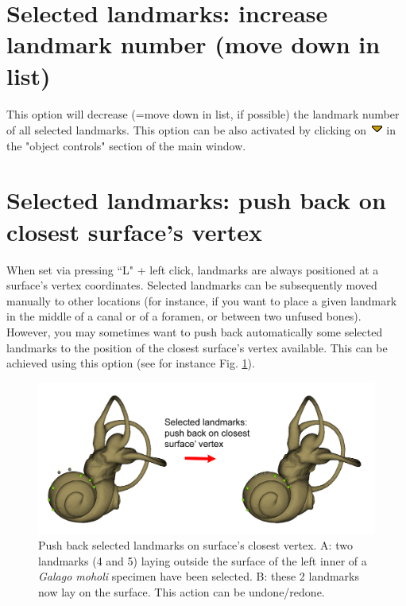 \section{Selected landmarks: increase landmark number (move down in list)}
 This option will decrease (=move down in list, if possible) the landmark number of all selected landmarks.
This option can be also activated by clicking on \includegraphics[scale=0.7]{images/06/objects/move_down.png} in the "object controls" section of the main window.

\section{Selected landmarks: push back on closest surface's vertex}
When set via pressing ``L" + left click, landmarks are always positioned at a surface's vertex coordinates. Selected
landmarks can be subsequently moved manually to other locations (for instance, if you want to place
a given landmark in the middle of a canal or of a foramen, or between two unfused bones). However,
you may sometimes want to push back automatically some selected landmarks to the position of the
closest surface's vertex available. This can be achieved using this option (see for instance Fig. \ref{push_back}).

\begin{figure}
  \centering
  \includegraphics[scale=0.27]{images/10/push_back.png} 
	\caption{Push back selected landmarks on surface's closest vertex. A: two landmarks (4 and 5) laying outside the surface of the left inner of a \textit{Galago moholi} specimen have been selected. B: these 2 landmarks now lay on the surface. This action can be undone/redone.}
\label{push_back}
 
\end{figure}



